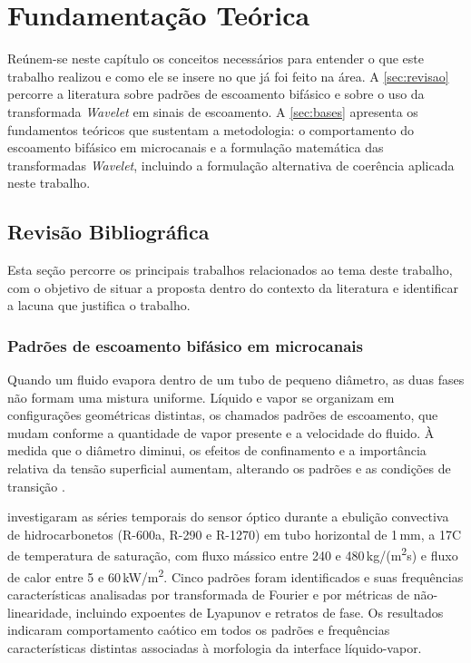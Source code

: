 \chapter{Fundamentação Teórica}\label{cap:fundamentacao}

Reúnem-se neste capítulo os conceitos necessários para entender o que este trabalho realizou e
como ele se insere no que já foi feito na área. A \autoref{sec:revisao} percorre a
literatura sobre padrões de escoamento bifásico e sobre o uso da transformada
\textit{Wavelet} em sinais de escoamento. A \autoref{sec:bases} apresenta os fundamentos
teóricos que sustentam a metodologia: o comportamento do escoamento bifásico em
microcanais e a formulação matemática das transformadas \textit{Wavelet}, incluindo a
formulação alternativa de coerência aplicada neste trabalho.

\section{Revisão Bibliográfica}\label{sec:revisao}

Esta seção percorre os principais trabalhos relacionados ao tema deste trabalho, com o
objetivo de situar a proposta dentro do contexto da literatura e identificar a lacuna
que justifica o trabalho.

\subsection{Padrões de escoamento bifásico em microcanais}\label{sec:rev-padroes}

Quando um fluido evapora dentro de um tubo de pequeno diâmetro, as duas fases não formam
uma mistura uniforme. Líquido e vapor se organizam em configurações geométricas distintas,
os chamados padrões de escoamento, que mudam conforme a quantidade de vapor presente e a
velocidade do fluido. À medida que o diâmetro diminui, os efeitos de confinamento e a
importância relativa da tensão superficial aumentam, alterando os padrões e as
condições de transição \cite{cheng2023}.

 investigaram as séries temporais do sensor óptico durante a
ebulição convectiva de hidrocarbonetos (R-600a, R-290 e R-1270) em tubo horizontal
de 1\,mm, a 17\textdegree{}C de temperatura de saturação, com fluxo mássico entre 240 e
480\,kg/(m\textsuperscript{2}s) e fluxo de calor entre 5 e 60\,kW/m\textsuperscript{2}.
Cinco padrões foram identificados e suas frequências características analisadas por
transformada de Fourier e por métricas de não-linearidade, incluindo expoentes de Lyapunov
e retratos de fase. Os resultados indicaram comportamento caótico em todos os padrões e
frequências características distintas associadas à morfologia da interface líquido-vapor.

